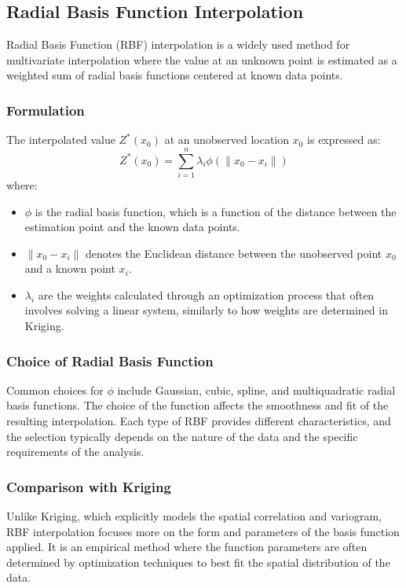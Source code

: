 \documentclass{article}
\begin{document}
\subsection{Radial Basis Function Interpolation}

Radial Basis Function (RBF) interpolation is a widely used method for multivariate interpolation where the value at an unknown point is estimated as a weighted sum of radial basis functions centered at known data points. 

\subsubsection{Formulation}
The interpolated value \( Z^*(x_0) \) at an unobserved location \( x_0 \) is expressed as:
\[
Z^*(x_0) = \sum_{i=1}^n \lambda_i \phi(\|x_0 - x_i\|)
\]
where:
\begin{itemize}
    \item \( \phi \) is the radial basis function, which is a function of the distance between the estimation point and the known data points.
    \item \( \|x_0 - x_i\| \) denotes the Euclidean distance between the unobserved point \( x_0 \) and a known point \( x_i \).
    \item \( \lambda_i \) are the weights calculated through an optimization process that often involves solving a linear system, similarly to how weights are determined in Kriging.
\end{itemize}

\subsubsection{Choice of Radial Basis Function}
Common choices for \( \phi \) include Gaussian, cubic, spline, and multiquadratic radial basis functions. The choice of the function affects the smoothness and fit of the resulting interpolation. Each type of RBF provides different characteristics, and the selection typically depends on the nature of the data and the specific requirements of the analysis.

\subsubsection{Comparison with Kriging}
Unlike Kriging, which explicitly models the spatial correlation and variogram, RBF interpolation focuses more on the form and parameters of the basis function applied. It is an empirical method where the function parameters are often determined by optimization techniques to best fit the spatial distribution of the data.
\end{document}
